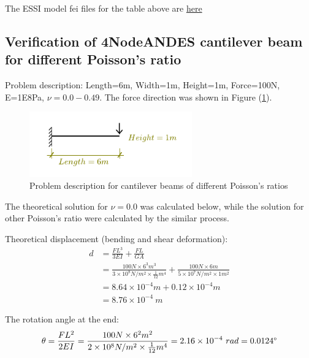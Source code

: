 \documentclass[fleqn,11pt,letter]{article}
\begin{document}
The ESSI model fei files for the table above are \href{https://github.com/yuan-energy/ESSI_Verification/blob/master/4NodeANDES/cantilever_different_geometry/cantilever_different_geometry.tar.gz?raw=true}{here}








\newpage
\subsection{Verification of 4NodeANDES cantilever beam for different Poisson's ratio}




Problem description: Length=6m, Width=1m, Height=1m, Force=100N, E=1E8Pa, $\nu=0.0-0.49$. The force direction was shown in Figure (\ref{fig Problem description for cantilever beams of different Poisson's 4}). 

\begin{figure}[H]
  \centering
  \includegraphics[width=7cm]{../Figure_files/4NodeANDES/cantilever_6.pdf}
  \caption{Problem description for cantilever beams of different Poisson's ratios}
  \label{fig Problem description for cantilever beams of different Poisson's 4}
\end{figure}


The theoretical solution for $\nu=0.0$ was calculated below, while the solution for other Poisson's ratio were calculated by the similar process.

Theoretical displacement (bending and shear deformation):
\begin{equation}
  \begin{aligned}
  d &=\frac{FL^3}{3EI}+\frac{FL}{GA} \\ 
    &= \frac{100 N \times 6^3 m^3}{3\times 10^8 N/m^2 \times \frac{1}{12} m^4}+ 
    \frac{100 N\times 6 m}{5\times 10^7 N/m^2\times 1 m^2} \\ 
    &=8.64\times 10^{-4} m + 0.12 \times 10^{-4} m  \\
   & =8.76\times 10^{-4} \ m
   \end{aligned}
\end{equation}

The rotation angle at the end:
\begin{equation}
  \theta =\frac{FL^2}{2EI} 
   =\frac{100 N \times 6^2 m^2} {2\times 10^8 N/m^2 \times \frac{1}{12} m^4} 
 =2.16 \times 10^{-4} \ rad = 0.0124 \degree 
\end{equation}
\end{document}
